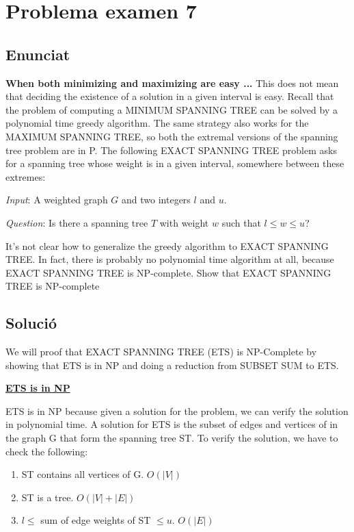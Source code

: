 \section{Problema examen 7}
\subsection{Enunciat}
\textbf{When both minimizing and maximizing are easy ...} This does not mean that deciding the existence of a solution in a given interval is easy. Recall that the problem of computing a MINIMUM SPANNING TREE can be solved by a polynomial time greedy algorithm. The same strategy also works for the MAXIMUM SPANNING TREE, so both the extremal versions of the spanning tree problem are in P. The following EXACT SPANNING TREE problem asks for a spanning tree whose weight is in a given interval, somewhere between these extremes:

\textit{Input}: A weighted graph $G$ and two integers $l$ and $u$. 

\textit{Question}: Is there a spanning tree $T$ with weight $w$ such that $l \leq w \leq u$?

\vspace{5mm}
It’s not clear how to generalize the greedy algorithm to EXACT SPANNING TREE. In fact, there is probably no polynomial time algorithm at all, because EXACT SPANNING TREE is NP-complete. Show that EXACT SPANNING TREE is NP-complete

\subsection{Solució}

We will proof that EXACT SPANNING TREE (ETS) is NP-Complete by showing that ETS is in NP and doing a reduction from SUBSET SUM to ETS.

\vspace{5mm}
\underline{\textbf{ETS is in NP}}

ETS is in NP because given a solution for the problem, we can verify the solution in polynomial time. A solution for ETS is the subset of edges and vertices of in the graph G that form the spanning tree ST. To verify the solution, we have to check the following:

\begin{enumerate}
	\item ST contains all vertices of G. $O(|V|)$
	\item ST is a tree. $O(|V|+|E|)$
	\item $l \le $ sum of edge weights of ST $\le u$. $O(|E|)$
\end{enumerate}

